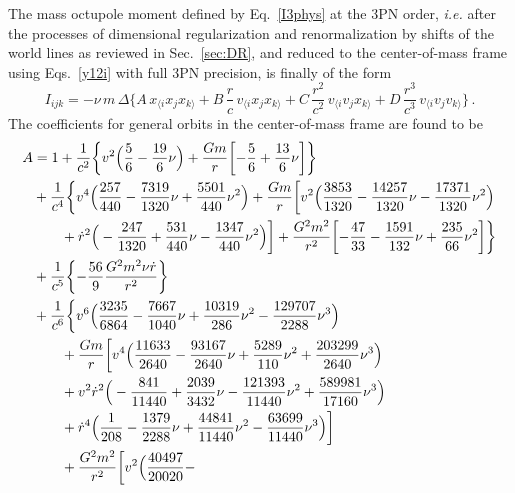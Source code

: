 \documentclass[prd,preprint,superscriptaddress,tightenlines,nofootinbib,
  eqsecnum,showpacs]{revtex4}
\begin{document}
The mass octupole moment defined by Eq.~\eqref{I3phys} at the 3PN
order, \textit{i.e.} after the processes of dimensional regularization
and renormalization by shifts of the world lines as reviewed in
Sec.~\ref{sec:DR}, and reduced to the center-of-mass frame using
Eqs.~\eqref{y12i} with full 3PN precision, is finally of the form
%
\begin{equation}\label{Iijk}
I_{ijk} = - \nu\,m\,\Delta\biggl\{A\,x_{\langle i}x_{j}x_{k\rangle} +
B\,\frac{r}{c}\,v_{\langle i}x_{j}x_{k\rangle} +
C\,\frac{r^2}{c^2}\,v_{\langle i}v_{j}x_{k\rangle} +
D\,\frac{r^3}{c^3}\,v_{\langle i}v_{j}v_{k\rangle} \biggr\}\,.
\end{equation}
%
The coefficients for general orbits in the center-of-mass frame are
found to be
%
\begin{subequations}\label{ABCD}
\begin{align}
A &= 1 + \frac{1}{c^{2}} \biggl\{v^2 \Bigl(\frac{5}{6} - \frac{19}{6}
\nu\Bigr) + \frac{G m}{r} \biggl[- \frac{5}{6} + \frac{13}{6}
  \nu\biggr] \biggr\}\nonumber\\ & + \frac{1}{c^{4}} \biggl\{v^4
\Bigl(\frac{257}{440} - \frac{7319}{1320} \nu + \frac{5501}{440}
\nu^2\Bigr) + \frac{G m}{r} \biggl[v^2 \Big( \frac{3853}{1320} -
  \frac{14257}{1320} \nu - \frac{17371}{1320} \nu^2 \Big)\nonumber\\ &
  \qquad + \dot{r}^2 \Big(- \frac{247}{1320} + \frac{531}{440} \nu -
  \frac{1347}{440} \nu^2\Big) \biggr] + \frac{G^2 m^2}{r^2} \biggl[-
  \frac{47}{33} - \frac{1591}{132} \nu + \frac{235}{66}
  \nu^2\biggr]\biggr\} \nonumber\\ & + \frac{1}{c^{5}} \biggl\{ -
\frac{56}{9} \frac{G^2 m^2 \nu \dot{r}}{r^2}\biggr\} \nonumber\\ & +
\frac{1}{c^{6}} \biggl\{v^6 \Bigl(\frac{3235}{6864} -
\frac{7667}{1040} \nu + \frac{10319}{286} \nu^2 - \frac{129707}{2288}
\nu^3\Bigr) \nonumber\\ & \qquad + \frac{G m}{r} \biggl[v^4
  \Big(\frac{11633}{2640} - \frac{93167}{2640} \nu+ \frac{5289}{110}
  \nu^2 + \frac{203299}{2640} \nu^3\Big)\nonumber\\ & \qquad + v^2
  \dot{r}^2 \Big(- \frac{841}{11440} + \frac{2039}{3432} \nu -
  \frac{121393}{11440} \nu^2 + \frac{589981}{17160} \nu^3\Big)
  \nonumber\\ & \qquad + \dot{r}^4 \Big(\frac{1}{208} -
  \frac{1379}{2288} \nu + \frac{44841}{11440} \nu^2 -
  \frac{63699}{11440} \nu^3\Big)\biggr]\nonumber\\ & \qquad +
\frac{G^2 m^2}{r^2} \biggl[v^2 \Big(\frac{40497}{20020} -

\end{align}
\end{subequations}
\end{document}
